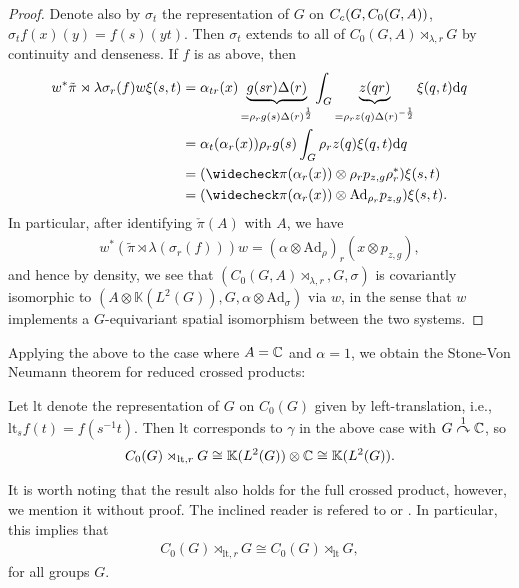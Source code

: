 \begin{proof}
	Denote also by $\sigma_t$ the representation of $G$ on $C_c(G,C_0(G,A))$, $\sigma_t f(x)(y) = f(s)(yt)$. Then $\sigma_t$ extends to all of $C_0(G,A) \rtimes_{\lambda, r}G$ by continuity and denseness. If $f$ is as above, then
	\begin{align*}
		w^* \tilde \pi \rtimes \lambda \sigma_r (f) w \xi(s,t) &= \alpha_{tr}(x)\underbrace{g(sr) \Delta(r)}_{= \rho_r g(s) \Delta(r) ^{\frac12}} \int_G \underbrace{z(qr)}_{= \rho_{r}z(q) \Delta(r)^{-\frac12}} \xi(q,t) \d q\\
		&= \alpha_{t} ( \alpha_r(x)) \rho_{r} g(s) \int_G \rho_r z(q) \xi(q,t) \d q\\ 
		&= ( \check \pi(\alpha_r(x)) \otimes \rho_r p_{z,g} \rho_{r}^*) \xi(s,t)\\
		&= ( \check \pi(\alpha_r(x)) \otimes \mathrm{Ad}_{\rho_r}p_{z,g}) \xi(s,t).
	\end{align*}
	In particular, after identifying $\check \pi (A) $ with $A$, we have
	\begin{align*}
		w^* (\tilde \pi \rtimes \lambda(\sigma_r(f)))w = (\alpha \otimes \mathrm{Ad}_{\rho})_r(x \otimes p_{z,g}),
	\end{align*}
	and hence by density, we see that $(C_0(G,A) \rtimes_{\lambda , r}, G , \sigma)$ is covariantly isomorphic to $(A \otimes \mathbb{K}(L^2(G)), G, \alpha \otimes \mathrm{Ad}_{\sigma})$ via $w$, in the sense that $w$ implements a $G$-equivariant spatial isomorphism between the two systems. 
\end{proof}
Applying the above to the case where $A = \mathbb{C}$ and $\alpha = 1$, we obtain the Stone-Von Neumann theorem for reduced crossed products:
\begin{corollary}
	Let $\mathrm{lt}$ denote the representation of $G$ on $C_0(G)$ given by left-translation, i.e., $\mathrm{lt}_s f(t) = f(s^{-1}t)$. Then $\mathrm{lt}$ corresponds to $\gamma$ in the above case with $G \stackrel{1}{\curvearrowright} \mathbb{C}$, so
	\begin{align*}
		C_0(G) \rtimes_{\mathrm{lt},r} G \cong \mathbb{K}(L^2(G)) \otimes \mathbb{C} \cong \mathbb{K}(L^2(G)).
	\end{align*}
\end{corollary}
It is worth noting that the result also holds for the full crossed product, however, we mention it without proof. The inclined reader is refered to \cite[Theorem 4.24]{williamscrossed} or \cite[§C.6 ]{williamsmorita}. In particular, this implies that
\begin{align*}
	C_0(G) \rtimes_{\mathrm{lt},r} G \cong C_0(G) \rtimes_{\mathrm{lt}}G,
\end{align*}
for all groups $G$.

